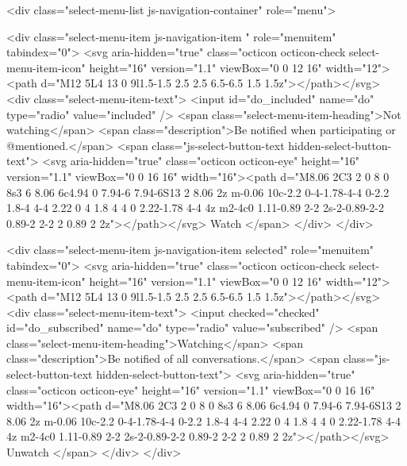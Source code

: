               <div class="select-menu-list js-navigation-container" role="menu">

                <div class="select-menu-item js-navigation-item " role="menuitem" tabindex="0">
                  <svg aria-hidden="true" class="octicon octicon-check select-menu-item-icon" height="16" version="1.1" viewBox="0 0 12 16" width="12"><path d="M12 5L4 13 0 9l1.5-1.5 2.5 2.5 6.5-6.5 1.5 1.5z"></path></svg>
                  <div class="select-menu-item-text">
                    <input id="do_included" name="do" type="radio" value="included" />
                    <span class="select-menu-item-heading">Not watching</span>
                    <span class="description">Be notified when participating or @mentioned.</span>
                    <span class="js-select-button-text hidden-select-button-text">
                      <svg aria-hidden="true" class="octicon octicon-eye" height="16" version="1.1" viewBox="0 0 16 16" width="16"><path d="M8.06 2C3 2 0 8 0 8s3 6 8.06 6c4.94 0 7.94-6 7.94-6S13 2 8.06 2z m-0.06 10c-2.2 0-4-1.78-4-4 0-2.2 1.8-4 4-4 2.22 0 4 1.8 4 4 0 2.22-1.78 4-4 4z m2-4c0 1.11-0.89 2-2 2s-2-0.89-2-2 0.89-2 2-2 2 0.89 2 2z"></path></svg>
                      Watch
                    </span>
                  </div>
                </div>

                <div class="select-menu-item js-navigation-item selected" role="menuitem" tabindex="0">
                  <svg aria-hidden="true" class="octicon octicon-check select-menu-item-icon" height="16" version="1.1" viewBox="0 0 12 16" width="12"><path d="M12 5L4 13 0 9l1.5-1.5 2.5 2.5 6.5-6.5 1.5 1.5z"></path></svg>
                  <div class="select-menu-item-text">
                    <input checked="checked" id="do_subscribed" name="do" type="radio" value="subscribed" />
                    <span class="select-menu-item-heading">Watching</span>
                    <span class="description">Be notified of all conversations.</span>
                    <span class="js-select-button-text hidden-select-button-text">
                      <svg aria-hidden="true" class="octicon octicon-eye" height="16" version="1.1" viewBox="0 0 16 16" width="16"><path d="M8.06 2C3 2 0 8 0 8s3 6 8.06 6c4.94 0 7.94-6 7.94-6S13 2 8.06 2z m-0.06 10c-2.2 0-4-1.78-4-4 0-2.2 1.8-4 4-4 2.22 0 4 1.8 4 4 0 2.22-1.78 4-4 4z m2-4c0 1.11-0.89 2-2 2s-2-0.89-2-2 0.89-2 2-2 2 0.89 2 2z"></path></svg>
                      Unwatch
                    </span>
                  </div>
                </div>

